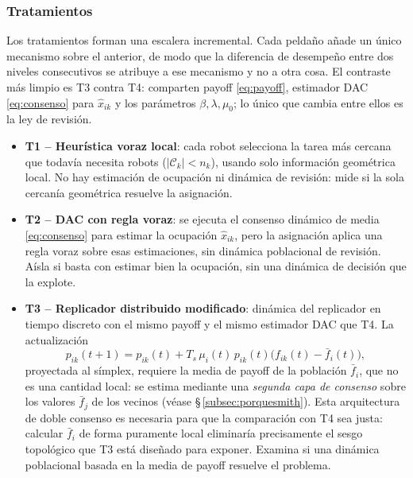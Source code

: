 \subsubsection{Tratamientos}

Los tratamientos forman una escalera incremental. Cada peldaño añade un único mecanismo
sobre el anterior, de modo que la diferencia de desempeño entre dos niveles consecutivos
se atribuye a ese mecanismo y no a otra cosa. El contraste más limpio es T3 contra T4:
comparten payoff \eqref{eq:payoff}, estimador DAC \eqref{eq:consenso} para $\hat{x}_{ik}$
y los parámetros $\beta,\lambda,\mu_0$; lo único que cambia entre ellos es la ley de
revisión.

\begin{itemize}
  \item \textbf{T1 -- Heurística voraz local}: cada robot selecciona la tarea más
    cercana que todavía necesita robots ($|\mathcal{C}_k| < n_k$), usando solo
    información geométrica local. No hay estimación de ocupación ni dinámica de
    revisión: mide si la sola cercanía geométrica resuelve la asignación.

  \item \textbf{T2 -- DAC con regla voraz}: se ejecuta el consenso dinámico de
    media \eqref{eq:consenso} para estimar la ocupación $\hat{x}_{ik}$, pero la
    asignación aplica una regla voraz sobre esas estimaciones, sin dinámica
    poblacional de revisión. Aísla si basta con estimar bien la ocupación, sin una
    dinámica de decisión que la explote.

  \item \textbf{T3 -- Replicador distribuido modificado}: dinámica del replicador
    en tiempo discreto \citep{quijano2017population} con el mismo payoff y el
    mismo estimador DAC que T4. La actualización
    \[
      p_{ik}(t{+}1) = p_{ik}(t) + T_s\,\mu_i(t)\,p_{ik}(t)\bigl(f_{ik}(t) - \bar{f}_i(t)\bigr),
    \]
    proyectada al símplex, requiere la media de payoff de la población
    $\bar{f}_i$, que no es una cantidad local: se estima mediante una
    \emph{segunda capa de consenso} sobre los valores $\bar{f}_j$ de los vecinos
    (véase \S\,\ref{subsec:porquesmith}). Esta arquitectura de doble consenso es
    necesaria para que la comparación con T4 sea justa: calcular $\bar{f}_i$ de
    forma puramente local eliminaría precisamente el sesgo topológico que T3 está
    diseñado para exponer. Examina si una dinámica poblacional basada en la media de
    payoff resuelve el problema.


\end{itemize}
